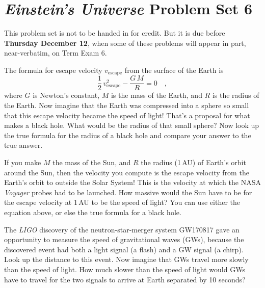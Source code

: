 \documentclass[12pt, letterpaper]{article}
\newcommand{\escape}{\mathrm{escape}}
\begin{document}
\section*{\textsl{Einstein's Universe} Problem Set 6}

This problem set is not to be handed in for credit. But it is due
before \textbf{Thursday December 12}, when some of these problems
will appear in part, near-verbatim, on Term Exam 6.

\begin{problem}
The formula for escape velocity $v_{\escape}$ from the surface of the Earth
is
\begin{equation}
\frac{1}{2}\,v_{\escape}^2 - \frac{G\,M}{R} = 0
\quad,
\end{equation}
where $G$ is Newton's constant, $M$ is the mass of the Earth, and $R$
is the radius of the Earth.
Now imagine that the Earth was compressed into a sphere so small that
this escape velocity became the speed of light! That's a proposal for what
makes a black hole. What would be the radius of that small sphere?
Now look up the true formula for the radius of a black hole and compare
your answer to the true answer.

If you make $M$ the mass of the Sun, and $R$ the radius (1\,AU) of
Earth's orbit around the Sun, then the velocity you compute is the
escape velocity from the Earth's orbit to outside the Solar System!
This is the velocity at which the {\small NASA} \textsl{Voyager} probes had to
be launched.
How massive would the Sun have to be for the escape velocity at 1\,AU
to be the speed of light? You can use either the equation above, or
else the true formula for a black hole.
\end{problem}

\begin{problem}
The \textsl{\small LIGO} discovery of the neutron-star-merger system
{\small GW170817} gave an opportunity to measure the speed of
gravitational waves (GWs), because the discovered event had both a
light signal (a flash) and a GW signal (a chirp).
Look up the distance to this event.
Now imagine that GWs travel more slowly than the speed of light.
How much slower than the speed of light would GWs have to travel for
the two signals to arrive at Earth separated by 10 seconds?
\end{problem}
\end{document}
